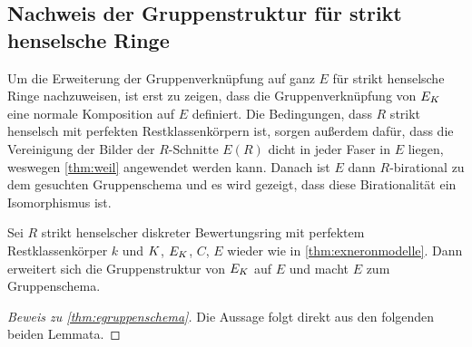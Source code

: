 \subsection{Nachweis der Gruppenstruktur für strikt henselsche Ringe}
Um die Erweiterung der Gruppenverknüpfung auf ganz $E$ für strikt
henselsche Ringe nachzuweisen, ist erst zu zeigen, dass die
Gruppenverknüpfung von $E_{K}$ eine normale Komposition auf $E$
definiert.
Die Bedingungen, dass $R$ strikt henselsch mit perfekten
Restklassenkörpern ist, sorgen außerdem dafür, dass die Vereinigung
der Bilder der $R$-Schnitte $E(R)$ dicht in jeder Faser in $E$ liegen,
weswegen \ref{thm:weil} angewendet werden kann.
Danach ist $E$ dann $R$-birational zu dem gesuchten
Gruppenschema und es wird gezeigt, dass diese Birationalität ein
Isomorphismus ist.
\begin{Satz}\label{thm:egruppenschema}
  Sei $R$ strikt henselscher diskreter Bewertungsring mit perfektem
  Restklassenkörper $k$ und $K$, $E_{K}$, $C$, $E$ wieder wie in
  \ref{thm:exneronmodelle}.
  Dann erweitert sich die Gruppenstruktur von $E_{K}$ auf $E$ und macht
  $E$ zum Gruppenschema.
  \begin{proof}[Beweis zu \ref{thm:egruppenschema}]
    Die Aussage folgt direkt aus den folgenden beiden Lemmata.
  \end{proof}
\end{Satz}
